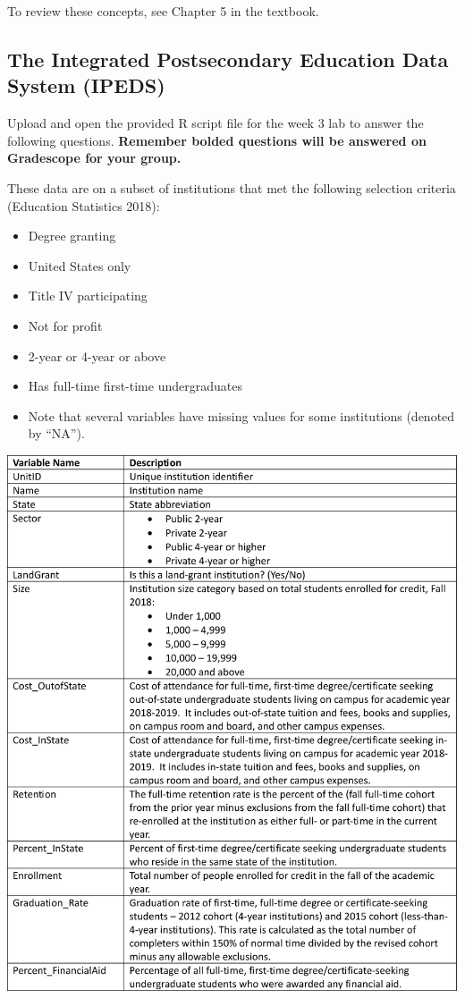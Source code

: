 \documentclass[
]{report}
\begin{document}
To review these concepts, see Chapter 5 in the textbook.

\hypertarget{the-integrated-postsecondary-education-data-system-ipeds}{%
\subsection{The Integrated Postsecondary Education Data System (IPEDS)}\label{the-integrated-postsecondary-education-data-system-ipeds}}

Upload and open the provided R script file for the week 3 lab to answer the following questions. \textbf{Remember bolded questions will be answered on Gradescope for your group.}

These data are on a subset of institutions that met the following selection criteria (Education Statistics 2018):

\begin{itemize}
\item
  Degree granting
\item
  United States only
\item
  Title IV participating
\item
  Not for profit
\item
  2-year or 4-year or above
\item
  Has full-time first-time undergraduates
\item
  Note that several variables have missing values for some institutions (denoted by ``NA'').
\end{itemize}

\begin{center}\includegraphics[width=0.77\linewidth]{images/IPEDS_Description} \end{center}
\end{document}
